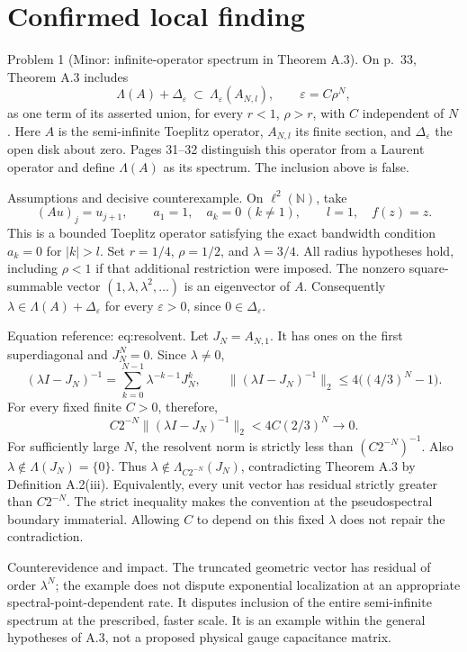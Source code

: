 \documentclass[10pt]{article}
\begin{document}
\section*{Confirmed local finding}
Problem 1 (Minor: infinite-operator spectrum in Theorem A.3).  On p. 33, Theorem A.3 includes \[\Lambda(A)+\Delta_\varepsilon
 \ \subset\ \Lambda_\varepsilon(A_{N,l}),
 \qquad \varepsilon=C\rho^N,\] as one term of its asserted union, for every \(r<1\), \(\rho>r\), with \(C\) independent of \(N\). Here \(A\) is the semi-infinite Toeplitz operator, \(A_{N,l}\) its finite section, and \(\Delta_\varepsilon\) the open disk about zero. Pages 31–32 distinguish this operator from a Laurent operator and define \(\Lambda(A)\) as its spectrum. The inclusion above is false.\par
Assumptions and decisive counterexample. On \(\ell^2(\mathbb N)\), take \[(Au)_j=u_{j+1},\qquad
 a_1=1,\quad a_k=0\ (k\ne1),\qquad l=1,\quad f(z)=z.\] This is a bounded Toeplitz operator satisfying the exact bandwidth condition \(a_k=0\) for \(|k|>l\). Set \(r=1/4\), \(\rho=1/2\), and \(\lambda=3/4\). All radius hypotheses hold, including \(\rho<1\) if that additional restriction were imposed. The nonzero square-summable vector \((1,\lambda,\lambda^2,\ldots)\) is an eigenvector of \(A\). Consequently \(\lambda\in\Lambda(A)+\Delta_\varepsilon\) for every \(\varepsilon>0\), since \(0\in\Delta_\varepsilon\).\par
Equation reference: eq:resolvent. Let \(J_N=A_{N,1}\). It has ones on the first superdiagonal and \(J_N^N=0\). Since \(\lambda\ne0\), \[(\lambda I-J_N)^{-1}
   =\sum_{k=0}^{N-1}\lambda^{-k-1}J_N^k,\qquad
 \|(\lambda I-J_N)^{-1}\|_2
   \le 4\big((4/3)^N-1\big).
 \] For every fixed finite \(C>0\), therefore, \[C2^{-N}\|(\lambda I-J_N)^{-1}\|_2
 <4C(2/3)^N\longrightarrow0.\] For sufficiently large \(N\), the resolvent norm is strictly less than \((C2^{-N})^{-1}\). Also \(\lambda\notin\Lambda(J_N)=\{0\}\). Thus \(\lambda\notin\Lambda_{C2^{-N}}(J_N)\), contradicting Theorem A.3 by Definition A.2(iii). Equivalently, every unit vector has residual strictly greater than \(C2^{-N}\). The strict inequality makes the convention at the pseudospectral boundary immaterial. Allowing \(C\) to depend on this fixed \(\lambda\) does not repair the contradiction.\par
Counterevidence and impact. The truncated geometric vector has residual of order \(\lambda^N\); the example does not dispute exponential localization at an appropriate spectral-point-dependent rate. It disputes inclusion of the entire semi-infinite spectrum at the prescribed, faster scale. It is an example within the general hypotheses of A.3, not a proposed physical gauge capacitance matrix.\par
\end{document}
